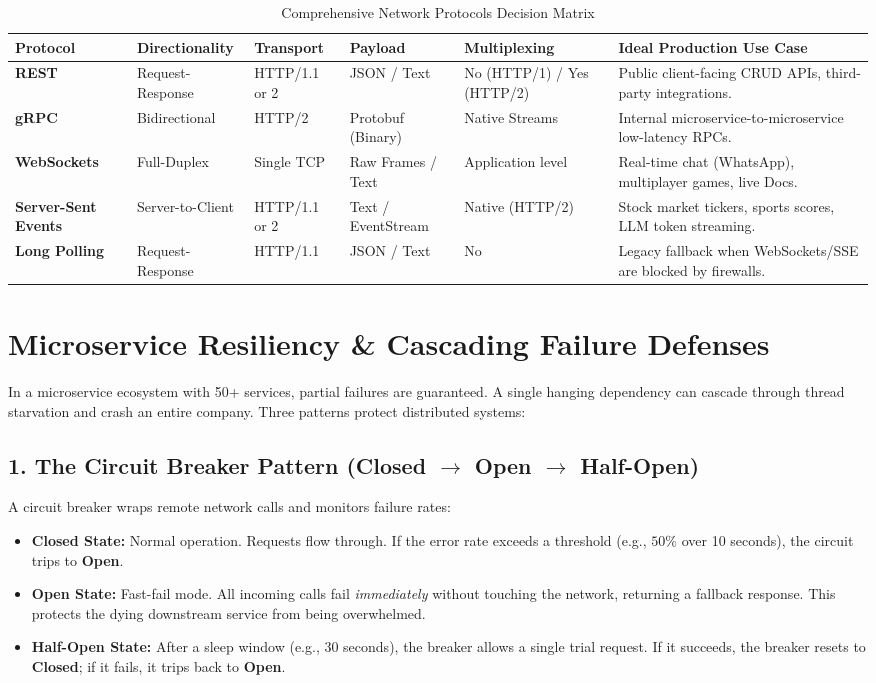 \documentclass[10pt,journal,compsoc,onecolumn]{IEEEtran}
\begin{document}
\begin{table}[htbp]
\caption{Comprehensive Network Protocols Decision Matrix}
\label{tab:protocol_matrix}
\centering
\begin{tabular}{lllllp{4.2cm}}
\toprule
\textbf{Protocol} & \textbf{Directionality} & \textbf{Transport} & \textbf{Payload} & \textbf{Multiplexing} & \textbf{Ideal Production Use Case} \\
\midrule
\textbf{REST} & Request-Response & HTTP/1.1 or 2 & JSON / Text & No (HTTP/1) / Yes (HTTP/2) & Public client-facing CRUD APIs, third-party integrations. \\
\textbf{gRPC} & Bidirectional & HTTP/2 & Protobuf (Binary) & Native Streams & Internal microservice-to-microservice low-latency RPCs. \\
\textbf{WebSockets} & Full-Duplex & Single TCP & Raw Frames / Text & Application level & Real-time chat (WhatsApp), multiplayer games, live Docs. \\
\textbf{Server-Sent Events} & Server-to-Client & HTTP/1.1 or 2 & Text / EventStream & Native (HTTP/2) & Stock market tickers, sports scores, LLM token streaming. \\
\textbf{Long Polling} & Request-Response & HTTP/1.1 & JSON / Text & No & Legacy fallback when WebSockets/SSE are blocked by firewalls. \\
\bottomrule
\end{tabular}
\end{table}

\section{Microservice Resiliency \& Cascading Failure Defenses}
\label{sec:resiliency}

In a microservice ecosystem with 50+ services, partial failures are guaranteed. A single hanging dependency can cascade through thread starvation and crash an entire company. Three patterns protect distributed systems:

\subsection{1. The Circuit Breaker Pattern (Closed $\to$ Open $\to$ Half-Open)}
A circuit breaker wraps remote network calls and monitors failure rates:
\begin{itemize}
    \item \textbf{Closed State:} Normal operation. Requests flow through. If the error rate exceeds a threshold (e.g., $50\%$ over 10 seconds), the circuit trips to \textbf{Open}.
    \item \textbf{Open State:} Fast-fail mode. All incoming calls fail \emph{immediately} without touching the network, returning a fallback response. This protects the dying downstream service from being overwhelmed.
    \item \textbf{Half-Open State:} After a sleep window (e.g., 30 seconds), the breaker allows a single trial request. If it succeeds, the breaker resets to \textbf{Closed}; if it fails, it trips back to \textbf{Open}.
\end{itemize}
\end{document}
